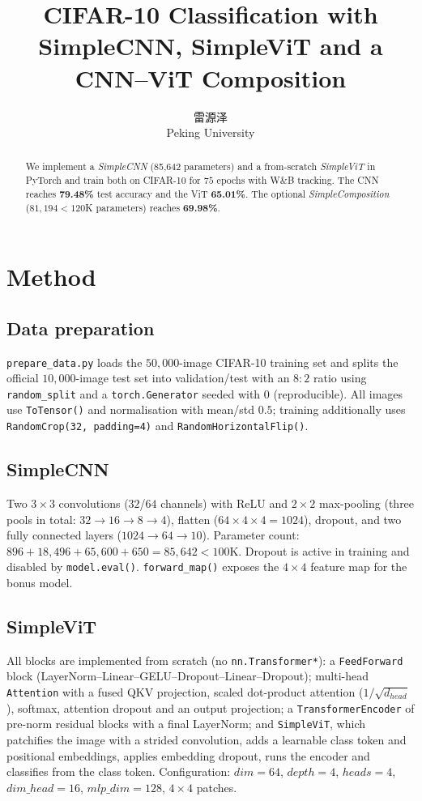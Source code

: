 \documentclass{article}
\title{CIFAR-10 Classification with SimpleCNN, SimpleViT and a CNN--ViT Composition}
\author{%
  雷源泽 \quad 2510124204\\
  Peking University
}
\begin{document}
\maketitle

\begin{abstract}
We implement a \emph{SimpleCNN} (85{,}642 parameters) and a from-scratch \emph{SimpleViT} in PyTorch and train both on CIFAR-10 for $75$ epochs with W\&B tracking. The CNN reaches \textbf{79.48\%} test accuracy and the ViT \textbf{65.01\%}. The optional \emph{SimpleComposition} ($81{,}194<120$K parameters) reaches \textbf{69.98\%}.
\end{abstract}

\section{Method}\label{sec:method}

\subsection{Data preparation}
\texttt{prepare\_data.py} loads the $50{,}000$-image CIFAR-10 training set and splits the official $10{,}000$-image test set into validation/test with an $8{:}2$ ratio using \texttt{random\_split} and a \texttt{torch.Generator} seeded with $0$ (reproducible). All images use \texttt{ToTensor()} and normalisation with mean/std $0.5$; training additionally uses \texttt{RandomCrop(32, padding=4)} and \texttt{RandomHorizontalFlip()}.

\subsection{SimpleCNN}
Two $3\times3$ convolutions ($32$/$64$ channels) with ReLU and $2\times2$ max-pooling (three pools in total: $32\!\to\!16\!\to\!8\!\to\!4$), flatten ($64\times4\times4=1024$), dropout, and two fully connected layers ($1024\!\to\!64\!\to\!10$). Parameter count: $896+18{,}496+65{,}600+650=85{,}642<100$K. Dropout is active in training and disabled by \texttt{model.eval()}. \texttt{forward\_map()} exposes the $4\times4$ feature map for the bonus model.

\subsection{SimpleViT}
All blocks are implemented from scratch (no \texttt{nn.Transformer*}): a \texttt{FeedForward} block (LayerNorm--Linear--GELU--Dropout--Linear--Dropout); multi-head \texttt{Attention} with a fused QKV projection, scaled dot-product attention ($1/\sqrt{d_{head}}$), softmax, attention dropout and an output projection; a \texttt{TransformerEncoder} of pre-norm residual blocks with a final LayerNorm; and \texttt{SimpleViT}, which patchifies the image with a strided convolution, adds a learnable class token and positional embeddings, applies embedding dropout, runs the encoder and classifies from the class token. Configuration: $dim=64$, $depth=4$, $heads=4$, $dim\_head=16$, $mlp\_dim=128$, $4\times4$ patches.
\end{document}
